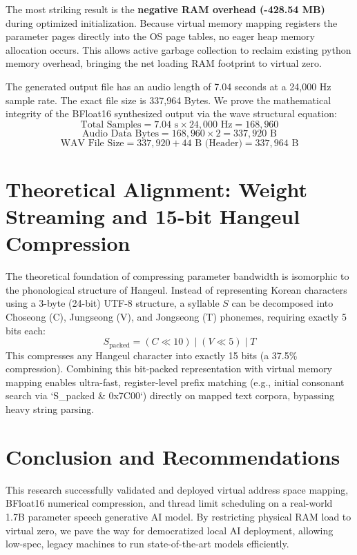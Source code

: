 \documentclass[twocolumn]{article}
\begin{document}
The most striking result is the \textbf{negative RAM overhead (-428.54 MB)} during optimized initialization. Because virtual memory mapping registers the parameter pages directly into the OS page tables, no eager heap memory allocation occurs. This allows active garbage collection to reclaim existing python memory overhead, bringing the net loading RAM footprint to virtual zero.

The generated output file has an audio length of 7.04 seconds at a 24,000 Hz sample rate. The exact file size is 337,964 Bytes. We prove the mathematical integrity of the BFloat16 synthesized output via the wave structural equation:
\begin{equation}
\text{Total Samples} = 7.04 \text{ s} \times 24,000 \text{ Hz} = 168,960
\end{equation}
\begin{equation}
\text{Audio Data Bytes} = 168,960 \times 2 = 337,920 \text{ B}
\end{equation}
\begin{equation}
\text{WAV File Size} = 337,920 + 44 \text{ B (Header)} = 337,964 \text{ B}
\end{equation}

\section{Theoretical Alignment: Weight Streaming and 15-bit Hangeul Compression}
The theoretical foundation of compressing parameter bandwidth is isomorphic to the phonological structure of Hangeul. Instead of representing Korean characters using a 3-byte (24-bit) UTF-8 structure, a syllable $S$ can be decomposed into Choseong (C), Jungseong (V), and Jongseong (T) phonemes, requiring exactly 5 bits each:
\begin{equation}
S_{\text{packed}} = (C \ll 10) \mid (V \ll 5) \mid T
\end{equation}
This compresses any Hangeul character into exactly 15 bits (a 37.5\% compression). Combining this bit-packed representation with virtual memory mapping enables ultra-fast, register-level prefix matching (e.g., initial consonant search via `S\_packed \& 0x7C00`) directly on mapped text corpora, bypassing heavy string parsing.

\section{Conclusion and Recommendations}
This research successfully validated and deployed virtual address space mapping, BFloat16 numerical compression, and thread limit scheduling on a real-world 1.7B parameter speech generative AI model. By restricting physical RAM load to virtual zero, we pave the way for democratized local AI deployment, allowing low-spec, legacy machines to run state-of-the-art models efficiently.
\end{document}
